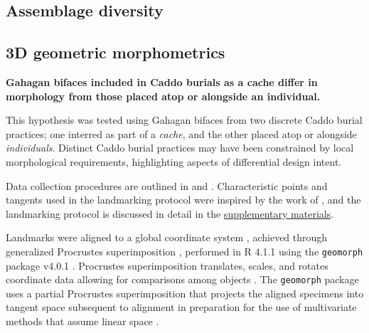 \documentclass[]{interact}
\theoremstyle{plain}%
\theoremstyle{definition}
\theoremstyle{remark}
\begin{document}
\hypertarget{assemblage-diversity}{%
\subsection{Assemblage diversity}\label{assemblage-diversity}}

\hypertarget{d-geometric-morphometrics}{%
\subsection{3D geometric
morphometrics}\label{d-geometric-morphometrics}}

\textbf{Gahagan bifaces included in Caddo burials as a cache differ in
morphology from those placed atop or alongside an individual.}

This hypothesis was tested using Gahagan bifaces from two discrete Caddo
burial practices; one interred as part of a \emph{cache}, and the other
placed atop or alongside \emph{individuals}. Distinct Caddo burial
practices may have been constrained by local morphological requirements,
highlighting aspects of differential design intent.

Data collection procedures are outlined in \cite{RN8154} and
\cite{RN8318}. Characteristic points and tangents used in the
landmarking protocol were inspired by the work of \cite{RN5700}, and the
landmarking protocol is discussed in detail in the
\href{https://seldenlab.github.io/gahaganmorph.3/}{supplementary
materials}.

Landmarks were aligned to a global coordinate system
\citep{RN8102,RN8587,RN8384}, achieved through generalized Procrustes
superimposition \citep{RN8525}, performed in R 4.1.1 \citep{RN8584}
using the \texttt{geomorph} package v4.0.1 \citep{RN8565,RN9565}.
Procrustes superimposition translates, scales, and rotates coordinate
data allowing for comparisons among objects \citep{RN5698,RN8525}. The
\texttt{geomorph} package uses a partial Procrustes superimposition that
projects the aligned specimens into tangent space subsequent to
alignment in preparation for the use of multivariate methods that assume
linear space \citep{RN8511,RN8384}.
\end{document}
